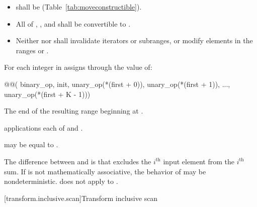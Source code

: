 \begin{itemdescr}
\pnum
\requires
\begin{itemize}
\item {} shall be  (Table~\ref{tab:moveconstructible}).
\item All of , ,
and  shall be convertible to
.
\item Neither  nor  shall invalidate iterators or
subranges, or modify elements in the ranges
 or
.
\end{itemize}

\pnum
\effects
For each integer  in 
assigns through  the value of:
\begin{codeblock}
@@(
    binary_op, init,
    unary_op(*(first + 0)), unary_op(*(first + 1)), ..., unary_op(*(first + K - 1)))
\end{codeblock}

\pnum
\returns
The end of the resulting range beginning at .

\pnum
\complexity
{} applications each of  and
.

\pnum
\remarks
{} may be equal to .

\pnum
\begin{note}
The difference between  and
 is that 
excludes the $i^\text{th}$ input element from the $i^\text{th}$ sum. If  is not
mathematically associative, the behavior of 
may be nondeterministic.  does not apply
 to .
\end{note}
\end{itemdescr}

[transform.inclusive.scan]{Transform inclusive scan}

